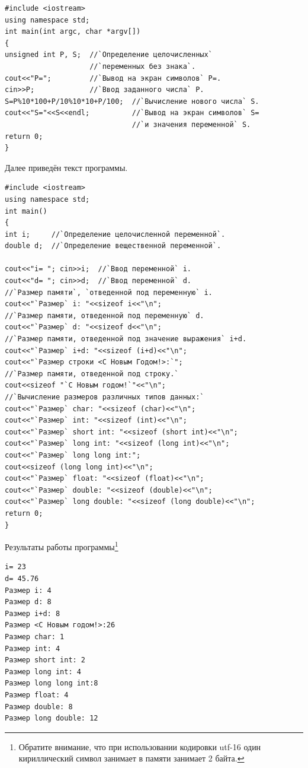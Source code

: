 \begin{lstlisting}
#include <iostream>
using namespace std;
int main(int argc, char *argv[])
{
unsigned int P, S;  //`Определение целочисленных`
                    //`переменных без знака`.
cout<<"P=";         //`Вывод на экран символов` P=.
cin>>P;             //`Ввод заданного числа` P.
S=P%10*100+P/10%10*10+P/100;  //`Вычисление нового числа` S.
cout<<"S="<<S<<endl;          //`Вывод на экран символов` S=
                              //`и значения переменной` S.
return 0;
}
\end{lstlisting}


Далее приведён текст программы.
\begin{lstlisting}
#include <iostream>
using namespace std;
int main()
{
int i;     //`Определение целочисленной переменной`.
double d;  //`Определение вещественной переменной`.

cout<<"i= "; cin>>i;  //`Ввод переменной` i.
cout<<"d= "; cin>>d;  //`Ввод переменной` d.
//`Размер памяти`, `отведенной под переменную` i.
cout<<"`Размер` i: "<<sizeof i<<"\n";
//`Размер памяти, отведенной под переменную` d.
cout<<"`Размер` d: "<<sizeof d<<"\n";
//`Размер памяти, отведенной под значение выражения` i+d.
cout<<"`Размер` i+d: "<<sizeof (i+d)<<"\n";
cout<<"`Размер строки <С Новым Годом!>:`";
//`Размер памяти, отведенной под строку.`
cout<<sizeof "`С Новым годом!`"<<"\n";
//`Вычисление размеров различных типов данных:`
cout<<"`Размер` char: "<<sizeof (char)<<"\n";
cout<<"`Размер` int: "<<sizeof (int)<<"\n";
cout<<"`Размер` short int: "<<sizeof (short int)<<"\n";
cout<<"`Размер` long int: "<<sizeof (long int)<<"\n";
cout<<"`Размер` long long int:";
cout<<sizeof (long long int)<<"\n";
cout<<"`Размер` float: "<<sizeof (float)<<"\n";
cout<<"`Размер` double: "<<sizeof (double)<<"\n";
cout<<"`Размер` long double: "<<sizeof (long double)<<"\n";
return 0;
}
\end{lstlisting}

Результаты работы программы\footnote{Обратите внимание, что при использовании кодировки utf-16 один кириллический символ
занимает в памяти занимает 2 байта.}

\begin{verbatim}
i= 23 
d= 45.76 
Размер i: 4 
Размер d: 8 
Размер i+d: 8 
Размер <С Новым годом!>:26 
Размер char: 1 
Размер int: 4 
Размер short int: 2 
Размер long int: 4 
Размер long long int:8 
Размер float: 4 
Размер double: 8 
Размер long double: 12 
\end{verbatim}

